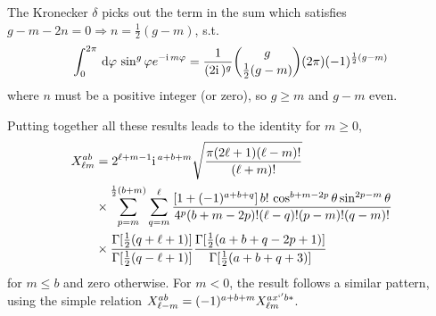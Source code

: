 The Kronecker $\delta$ picks out the term in the sum which satisfies $g - m -2n =0 \Rightarrow n = \frac{1}{2}(g-m)$, s.t. 
\begin{equation}
	\int_0^{2\pi} \,\mathrm{d}\varphi\, \sin^g\varphi e^{-\mathrm{i\,} m \varphi} = \frac{1}{(2\mathrm{i\,})^g} \binom{g}{\frac{1}{2}(g-m)} (2\pi) (-1)^{\frac{1}{2}(g-m)}\,
\end{equation}
where $n$ must be a positive integer (or zero), so $g \geq m$ and $g -m$ even.

Putting together all these results leads to the identity for $m \geq 0$,
\begin{align}\label{eq:sumformula} X_{\ell m}^{ab} &= 2^{\ell+m-1}\mathrm{i\,}^{a+b+m}\sqrt{\frac{\pi(2\ell+1)(\ell-m)!}{(\ell+m)!}}\nonumber\\
&\times
\sum_{p=m}^{\frac{1}{2}(b+m)}\sum_{q=m}^{\ell}
\frac{[1+(-1)^{a+b+q}]\,b!\,\cos^{b+m-2p}\theta\sin^{2p-m}\theta}{4^p(b+m-2p)!(\ell-q)!(p-m)!(q-m)!}\\
&\times \frac{\Gamma[\frac{1}{2}(q+\ell+1)]}{\Gamma[\frac{1}{2}(q-\ell+1)]}
\frac{\Gamma[\frac{1}{2}(a+b +q-2p+1)]}{\Gamma[\frac{1}{2}(a+b+q+3)]}
\end{align}
for $m\leq b$ and zero otherwise. For $m < 0$, the result follows a similar pattern, using the simple relation \(X_{\ell -m}^{ab} = (-1)^{a+b+m} X_{\ell m}^{ax`'b*}\).

